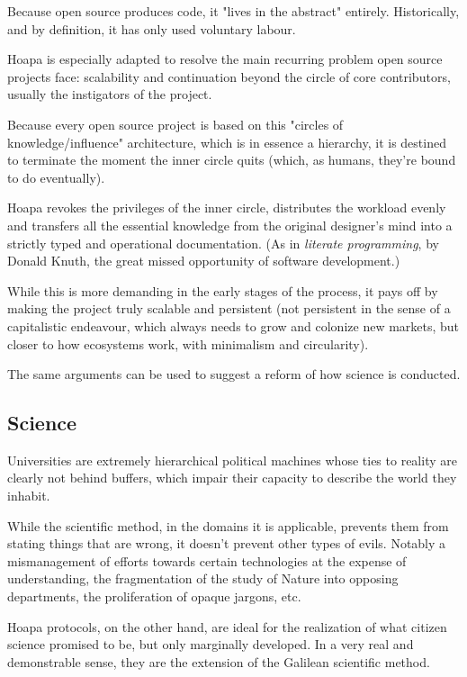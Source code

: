 \documentclass[11pt]{article}
\begin{document}
Because open source produces code, it "lives in the abstract" entirely. Historically, and by definition, it has only used voluntary labour.

Hoapa is especially adapted to resolve the main recurring problem open source projects face: scalability and continuation beyond the circle of core contributors, usually the instigators of the project.

Because every open source project is based on this "circles of knowledge/influence" architecture, which is in essence a hierarchy, it is destined to terminate the moment the inner circle quits (which, as humans, they're bound to do eventually).

Hoapa revokes the privileges of the inner circle, distributes the workload evenly and transfers all the essential knowledge from the original designer's mind into a strictly typed and operational documentation. (As in \emph{literate programming}, by Donald Knuth, the great missed opportunity of software development.)

While this is more demanding in the early stages of the process, it pays off by making the project truly scalable and persistent (not persistent in the sense of a capitalistic endeavour, which always needs to grow and colonize new markets, but closer to how ecosystems work, with minimalism and circularity).

The same arguments can be used to suggest a reform of how science is conducted.

\subsection{Science}

Universities are extremely hierarchical political machines whose ties to reality are clearly not behind buffers, which impair their capacity to describe the world they inhabit.

While the scientific method, in the domains it is applicable, prevents them from stating things that are wrong, it doesn't prevent other types of evils. Notably a mismanagement of efforts towards certain technologies at the expense of understanding, the fragmentation of the study of Nature into opposing departments, the proliferation of opaque jargons, etc.

Hoapa protocols, on the other hand, are ideal for the realization of what citizen science promised to be, but only marginally developed. In a very real and demonstrable sense, they are the extension of the Galilean scientific method.
\end{document}
